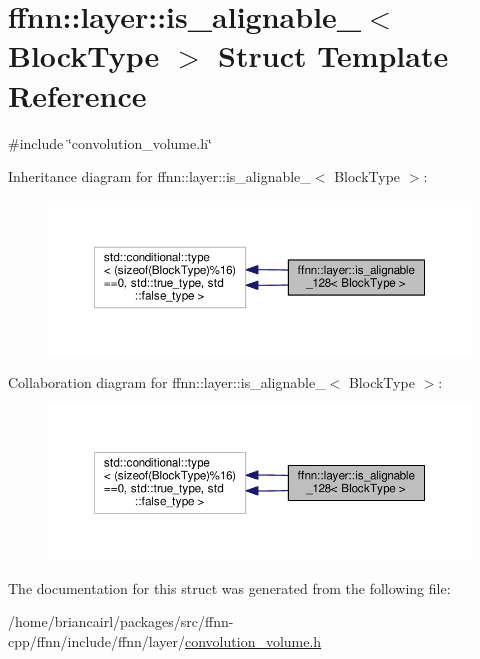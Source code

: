 \hypertarget{structffnn_1_1layer_1_1is__alignable__128}{\section{ffnn\-:\-:layer\-:\-:is\-\_\-alignable\-\_$<$ Block\-Type $>$ Struct Template Reference}
\label{structffnn_1_1layer_1_1is__alignable__128}
}


{\ttfamily \#include \char`\"{}convolution\-\_\-volume.\-h\char`\"{}}



Inheritance diagram for ffnn\-:\-:layer\-:\-:is\-\_\-alignable\-\_$<$ Block\-Type $>$\-:\nopagebreak
\begin{figure}[H]
\begin{center}
\leavevmode
\includegraphics[width=350pt]{structffnn_1_1layer_1_1is__alignable__128__inherit__graph}
\end{center}
\end{figure}


Collaboration diagram for ffnn\-:\-:layer\-:\-:is\-\_\-alignable\-\_$<$ Block\-Type $>$\-:\nopagebreak
\begin{figure}[H]
\begin{center}
\leavevmode
\includegraphics[width=350pt]{structffnn_1_1layer_1_1is__alignable__128__coll__graph}
\end{center}
\end{figure}


The documentation for this struct was generated from the following file\-:\begin{DoxyCompactItemize}
\item 
/home/briancairl/packages/src/ffnn-\/cpp/ffnn/include/ffnn/layer/\hyperlink{convolution__volume_8h}{convolution\-\_\-volume.\-h}\end{DoxyCompactItemize}
